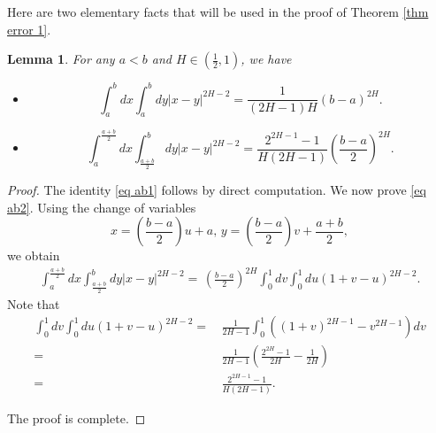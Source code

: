 \documentclass[11pt,reqno]{amsart}
\numberwithin{equation}{section}
\newtheorem{lemma}{Lemma}[section]
\newcommand{\1}{{\bf 1}}
\newcommand{\2}{{\bf 2}}
\begin{document}
 Here are two elementary facts that will be used in the proof of Theorem \ref{thm error 1}. 
   \begin{lemma}
 For any $a<b$ and $H\in \left(\frac12, 1\right)$, we have 
 \begin{itemize}
\item[(a)] \begin{equation}\label{eq ab1}
 \int_a^bdx \int_a^bdy |x-y|^{2H-2}    = \frac{1}{(2H-1)H} (b-a)^{2H}.
 \end{equation}
 \item[(b)]
  \begin{equation}\label{eq ab2}
\int_{a}^{\frac{a+b}{2}}dx\int_{\frac{a+b}{2}}^bdy  |x-y|^{2H-2} =\frac{ 2^{2H-1} - 1}{H(2H-1)}  \left(\frac{b-a}{2}\right)^{2H}.
 \end{equation}
 \end{itemize}
 \end{lemma} 
  \begin{proof} The identity  \eqref{eq ab1} follows by  direct computation. We now prove \eqref{eq ab2}.  Using the change of variables $$x= \left(\frac{b-a}{2}\right)u+a,\,  y=\left(\frac{b-a}{2}\right)v +\frac{a+b}{2},$$ 
  we obtain
 \begin{align*}
  \int_{a}^{\frac{a+b}{2}}dx\int_{\frac{a+b}{2}}^bdy  |x-y|^{2H-2} 
  = \, \left(\frac{b-a}{2}\right)^{2H}\int_{0}^{1}dv\int_{0}^1du (1+v-u)^{2H-2}.
 \end{align*}
 Note that 
 \begin{align*}
\int_{0}^{1}  dv  \int_{0}^{1} du (1 + v - u)^{2H-2}    =&\,   \frac{1}{2H-1} \int_{0}^{1}    \left((1+v)^{2H-1} - v^{2H-1}\right)dv  \\
=&\,  \frac{1}{2H-1} \left( \frac{2^{2H} - 1}{2H} - \frac{1}{2H}\right)\\
=&\, \frac{ 2^{2H-1} - 1}{H(2H-1)}.
 \end{align*}
 
 The proof is complete.   
  \end{proof}

 
\end{document}
